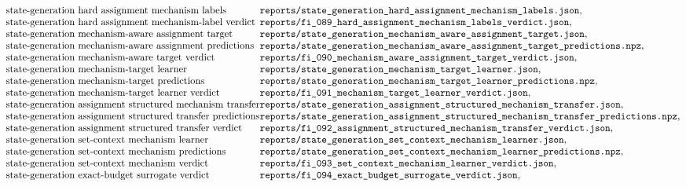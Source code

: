 $$\begin{array}{@{}l@{}l@{}}
\text{state-generation hard assignment mechanism labels} & \texttt{reports/state\_generation\_hard\_assignment\_mechanism\_labels.json},\\
\text{state-generation hard assignment mechanism-label verdict} & \texttt{reports/fi\_089\_hard\_assignment\_mechanism\_labels\_verdict.json},\\
\text{state-generation mechanism-aware assignment target} & \texttt{reports/state\_generation\_mechanism\_aware\_assignment\_target.json},\\
\text{state-generation mechanism-aware assignment predictions} & \texttt{reports/state\_generation\_mechanism\_aware\_assignment\_target\_predictions.npz},\\
\text{state-generation mechanism-aware target verdict} & \texttt{reports/fi\_090\_mechanism\_aware\_assignment\_target\_verdict.json},\\
\text{state-generation mechanism-target learner} & \texttt{reports/state\_generation\_mechanism\_target\_learner.json},\\
\text{state-generation mechanism-target predictions} & \texttt{reports/state\_generation\_mechanism\_target\_learner\_predictions.npz},\\
\text{state-generation mechanism-target learner verdict} & \texttt{reports/fi\_091\_mechanism\_target\_learner\_verdict.json},\\
\text{state-generation assignment structured mechanism transfer} & \texttt{reports/state\_generation\_assignment\_structured\_mechanism\_transfer.json},\\
\text{state-generation assignment structured transfer predictions} & \texttt{reports/state\_generation\_assignment\_structured\_mechanism\_transfer\_predictions.npz},\\
\text{state-generation assignment structured transfer verdict} & \texttt{reports/fi\_092\_assignment\_structured\_mechanism\_transfer\_verdict.json},\\
\text{state-generation set-context mechanism learner} & \texttt{reports/state\_generation\_set\_context\_mechanism\_learner.json},\\
\text{state-generation set-context mechanism predictions} & \texttt{reports/state\_generation\_set\_context\_mechanism\_learner\_predictions.npz},\\
\text{state-generation set-context mechanism verdict} & \texttt{reports/fi\_093\_set\_context\_mechanism\_learner\_verdict.json},\\
\text{state-generation exact-budget surrogate verdict} & \texttt{reports/fi\_094\_exact\_budget\_surrogate\_verdict.json},\\

\end{array}$$

